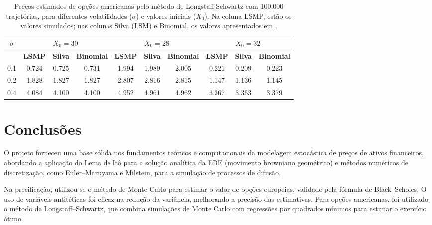 \documentclass[12pt,openright,oneside,a4paper]{abntex2}
\numberwithin{equation}{section}
\begin{document}
\begin{table}[H]
\centering
\scriptsize %
\renewcommand{\arraystretch}{1.1} %
\caption{Preços estimados de opções americanas pelo método de Longstaff-Schwartz com 100.000 trajetórias, para diferentes volatilidades ($\sigma$) e valores iniciais ($X_0$). Na coluna LSMP, estão os valores simulados; nas colunas Silva (LSM) e Binomial, os valores apresentados em \textcite{silva2012}.}
\vspace{2em}
\label{tab:lsm}
\begin{tabular}{|c|c|c|c|c|c|c|c|c|c|}
\hline
$\sigma$ 
& \multicolumn{3}{c|}{$X_0 = 30$} 
& \multicolumn{3}{c|}{$X_0 = 28$} 
& \multicolumn{3}{c|}{$X_0 = 32$} \\
\hline
  & \textbf{LSMP} & \textbf{Silva} & \textbf{Binomial} 
  & \textbf{LSMP} & \textbf{Silva} & \textbf{Binomial} 
  & \textbf{LSMP} & \textbf{Silva} & \textbf{Binomial} \\
\hline
0.1 & 0.724 & 0.725 & 0.731 
    & 1.994 & 1.989 & 2.005 
    & 0.221 & 0.209 & 0.223 \\
0.2 & 1.828 & 1.827 & 1.827 
    & 2.807 & 2.816 & 2.815 
    & 1.147 & 1.136 & 1.145 \\
0.4 & 4.084 & 4.100 & 4.100 
    & 4.952 & 4.961 & 4.962 
    & 3.367 & 3.363 & 3.379 \\
\hline
\end{tabular}
\end{table}




\newpage
\section{Conclusões}
O projeto forneceu uma base sólida nos fundamentos teóricos e computacionais da modelagem estocástica de preços de ativos financeiros, abordando a aplicação do Lema de Itô para a solução analítica da EDE (movimento browniano geométrico) e métodos numéricos de discretização, como Euler–Maruyama e Milstein, para a simulação de processos de difusão.


Na precificação, utilizou-se o método de Monte Carlo para estimar o valor de opções europeias, validado pela fórmula de Black–Scholes. O uso de variáveis antitéticas foi eficaz na redução da variância, melhorando a precisão das estimativas. Para opções americanas, foi utilizado o método de Longstaff–Schwartz, que combina simulações de Monte Carlo com regressões por quadrados mínimos para estimar o exercício ótimo.
\end{document}
